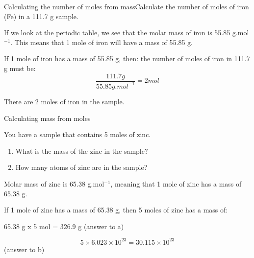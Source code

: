 \begin{wex}{Calculating the number of moles from mass}{Calculate the number of moles of iron (Fe) in a 111.7 g sample.\\}

{
If we look at the periodic table, we see that the molar mass of iron is 55.85 g.mol$^{-1}$. This means that 1 mole of iron will have a mass of 55.85 g.\\
}

{
If 1 mole of iron has a mass of 55.85 g, then: the number of moles of iron in 111.7 g must be:
\begin{equation*}
\frac{111.7 g}{55.85 g.mol^{-1}} = 2 mol
\end{equation*}

There are 2 moles of iron in the sample.
}
\end{wex}

\begin{wex}{Calculating mass from moles}{You have a sample that contains 5 moles of zinc.

\begin{enumerate}
\item{What is the mass of the zinc in the sample?}
\item{How many atoms of zinc are in the sample?}
\end{enumerate}
}

{
Molar mass of zinc is 65.38 g.mol$^{-1}$, meaning that 1 mole of zinc has a mass of 65.38 g.
}\\

{
If 1 mole of zinc has a mass of 65.38 g, then 5 moles of zinc has a mass of:
\begin{center}
65.38 g x 5 mol = 326.9 g (answer to a)
\end{center}
}
{
\begin{equation*}
5 \times 6.023 \times 10^{23} = 30.115 \times 10^{23}
\end{equation*}
(answer to b) }
\end{wex}

